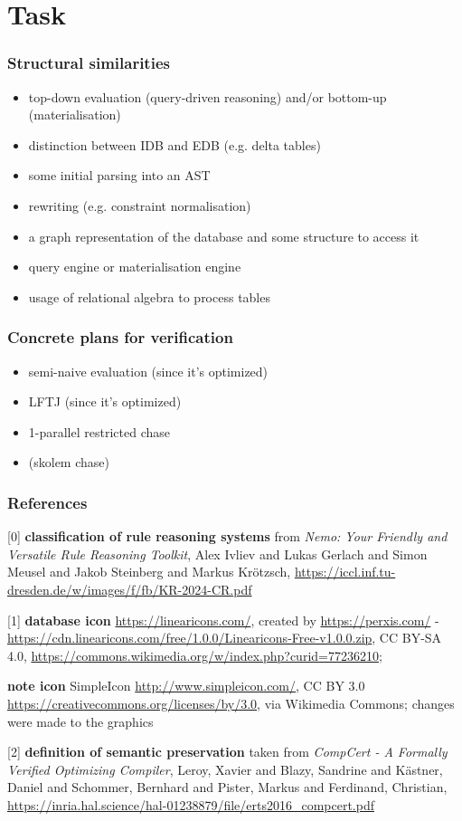 \documentclass[aspectratio=169]{beamer}
\begin{document}
\section{Task}

\begin{frame}
	\frametitle{Structural similarities}
		\begin{itemize}
			\item top-down evaluation (query-driven reasoning) and/or bottom-up (materialisation)
			\item distinction between IDB and EDB (e.g. delta tables)
			\item some initial parsing into an AST
			\item rewriting (e.g. constraint normalisation)
			\item a graph representation of the database and some structure to access it
			\item query engine or materialisation engine
			\item usage of relational algebra to process tables
		\end{itemize}
\end{frame}

\begin{frame}
	\frametitle{Concrete plans for verification}
	\begin{itemize}
		\item semi-naive evaluation (since it's optimized)
		\item LFTJ (since it's optimized)
		\item 1-parallel restricted chase
		\item (skolem chase)
	\end{itemize}
\end{frame}

\begin{frame}
\end{frame}

\begin{frame}
	\frametitle{References}
	\tiny{
	[0] \textbf{classification of rule reasoning systems} from \textit{Nemo: Your Friendly and Versatile Rule Reasoning Toolkit}, Alex Ivliev and Lukas Gerlach and Simon Meusel and Jakob Steinberg and Markus Krötzsch, \url{https://iccl.inf.tu-dresden.de/w/images/f/fb/KR-2024-CR.pdf}
	
	[1] \textbf{database icon} \url{https://linearicons.com/}, created by \url{https://perxis.com/} - \url{https://cdn.linearicons.com/free/1.0.0/Linearicons-Free-v1.0.0.zip}, CC BY-SA 4.0, \url{https://commons.wikimedia.org/w/index.php?curid=77236210};
	
	\textbf{note icon} SimpleIcon \url{http://www.simpleicon.com/}, CC BY 3.0 \url{https://creativecommons.org/licenses/by/3.0}, via Wikimedia Commons; changes were made to the graphics
	
	[2] \textbf{definition of semantic preservation} taken from \textit{CompCert - A Formally Verified Optimizing Compiler}, Leroy, Xavier and Blazy, Sandrine and Kästner, Daniel and Schommer, Bernhard and Pister, Markus and Ferdinand, Christian, \url{https://inria.hal.science/hal-01238879/file/erts2016_compcert.pdf}}
  
\end{frame}


	
\end{document}
